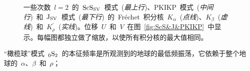 \begin{figure}
\centering
{}
{
}
\caption[ScS&J&PKIKPkernels]{
一些次数~$l=2$~的~${\rm ScS}_{\rm SV}$~模式~({\em 最上行\/})、PKIKP~模式~({\em 中间行\/})~和~${\rm J}_{\rm SV}$~模式~({\em 最下行\/})~的~Fr\'{e}chet~积分核~$K_{\alpha}$~({\em 点线\/})、$K_{\beta}$~({\em 虚线\/})~和~$K_{\rho}^{\prime}$~({\em 实线\/})。位移~$U$~和~$V$~在图~\protect\ref{fig:ScS&J&PKIKP}~中显示。每幅图都独立做了缩放，以使所有积分核的最大值相同。
}
\label{9.fig.spher3}
\end{figure}
“橄榄球”模式~${}_0{\rm S}_2$~的本征频率是所观测到的地球的最低频振荡，它依赖于整个地球的~$\alpha$、$\beta$~和~$\rho$；
%
%
